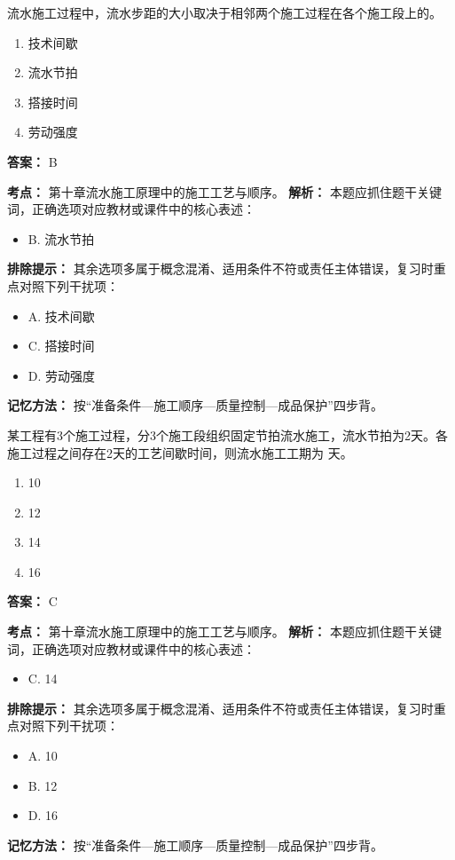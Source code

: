 \documentclass[UTF8,fontset=fandol,11pt]{ctexart}
\begin{document}
\begin{quizbox}[title={第 9 题}]
流水施工过程中，流水步距的大小取决于相邻两个施工过程在各个施工段上的。\\
\begin{enumerate}[label=\Alph*.]
\item 技术间歇
\item 流水节拍
\item 搭接时间
\item 劳动强度
\end{enumerate}
\textbf{答案：} B
\vspace{0.25em}
\begin{answerbox}[title={考点解析}]
\textbf{考点：} 第十章流水施工原理中的施工工艺与顺序。
\textbf{解析：} 本题应抓住题干关键词，正确选项对应教材或课件中的核心表述：
\begin{itemize}
\item B. 流水节拍
\end{itemize}
\textbf{排除提示：} 其余选项多属于概念混淆、适用条件不符或责任主体错误，复习时重点对照下列干扰项：
\begin{itemize}
\item A. 技术间歇
\item C. 搭接时间
\item D. 劳动强度
\end{itemize}
\textbf{记忆方法：} 按“准备条件—施工顺序—质量控制—成品保护”四步背。
\end{answerbox}
\end{quizbox}

\begin{quizbox}[title={第 10 题}]
某工程有3个施工过程，分3个施工段组织固定节拍流水施工，流水节拍为2天。各施工过程之间存在2天的工艺间歇时间，则流水施工工期为 天。\\
\begin{enumerate}[label=\Alph*.]
\item 10
\item 12
\item 14
\item 16
\end{enumerate}
\textbf{答案：} C
\vspace{0.25em}
\begin{answerbox}[title={考点解析}]
\textbf{考点：} 第十章流水施工原理中的施工工艺与顺序。
\textbf{解析：} 本题应抓住题干关键词，正确选项对应教材或课件中的核心表述：
\begin{itemize}
\item C. 14
\end{itemize}
\textbf{排除提示：} 其余选项多属于概念混淆、适用条件不符或责任主体错误，复习时重点对照下列干扰项：
\begin{itemize}
\item A. 10
\item B. 12
\item D. 16
\end{itemize}
\textbf{记忆方法：} 按“准备条件—施工顺序—质量控制—成品保护”四步背。
\end{answerbox}
\end{quizbox}
\end{document}
